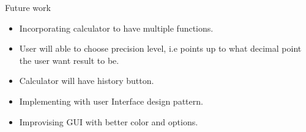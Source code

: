 \documentclass[final]{beamer}
\newlength{\sepwid}
\newlength{\onecolwid}
\newlength{\twocolwid}
\begin{document}
\begin{frame}
\begin{columns}[t]
\begin{column}{\twocolwid}
\begin{columns}[t,totalwidth=\twocolwid]
\begin{column}{\onecolwid}
\begin{exampleblock}{Future work}
\begin{itemize}
\item Incorporating calculator to have multiple functions.
\item User will able to choose precision level, i.e points up to  what decimal point the user want result to be. 
\item Calculator will have history button.
\item Implementing with user Interface design pattern.
\item Improvising GUI with better color and options. 
\end{itemize}

\end{exampleblock}


\end{column} %

\end{columns} %



\begin{columns}[t,totalwidth=\twocolwid] %

\begin{column}{\onecolwid} %



\end{column} %
\begin{column}{\sepwid}\end{column} %

\begin{column}{\onecolwid} %




\end{column}
\end{columns}
\end{column}
\end{columns}
\end{frame}
\end{document}
